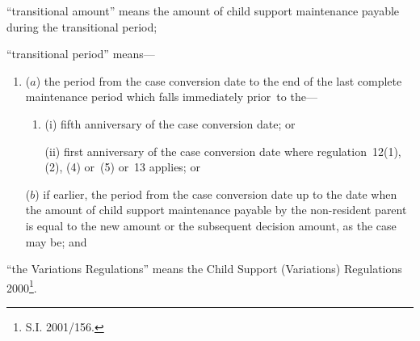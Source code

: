 \documentclass[12pt,a4paper]{article}
\begin{document}
\begin{enumerate}
“transitional amount” means the amount of child support maintenance payable during the transitional period;

“transitional period” means—
\begin{enumerate}\item[]
($a$) 
the period from the case conversion date to the end of the last complete maintenance period which falls immediately prior~to the—
\begin{enumerate}\item[]
(i) 
fifth anniversary of the case conversion date; or

(ii) 
first anniversary of the case conversion date where regulation~12(1), (2), (4) or~(5) or~13 applies; or
\end{enumerate}

($b$) 
if earlier, the period from the case conversion date up to the date when the amount of child support maintenance payable by the non-resident parent is equal to the new amount or the subsequent decision amount, as the case may be; and
\end{enumerate}

“the Variations Regulations” means the Child Support (Variations) Regulations 2000\footnote{\frenchspacing S.I. 2001/156.}.
\end{enumerate}
\end{document}
